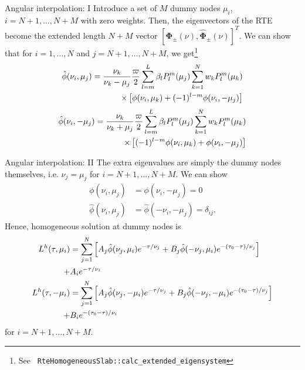 \documentclass{beamer}
\newcommand{\gvec}[1]{\boldsymbol{#1}}
\begin{document}
\begin{frame}{Angular interpolation: I}
  Introduce a set of $M$ dummy nodes $\mu_i$, $i=N+1,\ldots,N+M$ with
  zero weights. Then, the eigenvectors of the RTE become the extended
  length $N+M$ vector $[\gvec{\Phi}_\pm(\nu),
  \hat{\gvec{\Phi}}_\pm(\nu)]^T$. We can show that for $i=1,\ldots,N$
  and $j=N+1,\ldots,N+M$, we get\footnote{See {\tt
      RteHomogeneousSlab::calc\_extended\_eigensystem}}
  \begin{align}
    \hat{\phi}(\nu_i,\mu_j) = \frac{\nu_k}{\nu_k-\mu_j} \frac{\varpi}{2}
    \sum_{l=m}^L \beta_l P_l^m(\mu_j) \sum_{k=1}^N
    w_k P_l^m(\mu_k) \notag \\
    \times \left[
      \phi(\nu_i,\mu_k) + (-1)^{l-m}\phi(\nu_i,-\mu_j)
    \right]
    \end{align}
    \begin{align}
    \hat{\phi}(\nu_i,-\mu_j) = \frac{\nu_k}{\nu_k+\mu_j} \frac{\varpi}{2}
    \sum_{l=m}^L \beta_l P_l^m(\mu_j) \sum_{k=1}^N
    w_k P_l^m(\mu_k) \notag \\
    \times \left[
      (-1)^{l-m} \phi(\nu_i,\mu_k) + \phi(\nu_i,-\mu_j)
    \right]
  \end{align}
\end{frame}

\begin{frame}{Angular interpolation: II}
  The extra eigenvalues are simply the dummy nodes themselves,
  i.e. $\nu_j = \mu_j$ for $i=N+1,\ldots,N+M$. We can show
  \begin{align}
    \phi(\nu_i,\mu_j) &= \phi(\nu_i,-\mu_j) = 0 \\
    \hat{\phi}(\nu_i,\mu_j) &= \hat{\phi}(-\nu_i,-\mu_j) = \delta_{ij}.
  \end{align}
  Hence, homogeneous solution at dummy nodes is
  \begin{align}
    L^h(\tau,\mu_i) &= \sum_{j=1}^N
    \left[
      A_j \hat{\phi}(\nu_j, \mu_i) e^{-\tau/\nu_j} +
      B_j \hat{\phi}(-\nu_j, \mu_i) e^{-(\tau_0-\tau)/\nu_j}
    \right] \notag \\
    + &A_i e^{-\tau/\nu_i} \\
    L^h(\tau,-\mu_i) &= \sum_{j=1}^N
    \left[
      A_j \hat{\phi}(\nu_j, -\mu_i) e^{-\tau/\nu_j} +
      B_j \hat{\phi}(-\nu_j, -\mu_i) e^{-(\tau_0-\tau)/\nu_j}
    \right] \notag \\
    + &B_i e^{-(\tau_0-\tau)/\nu_i}
  \end{align}
  for $i=N+1,\ldots,N+M$.
\end{frame}
\end{document}
